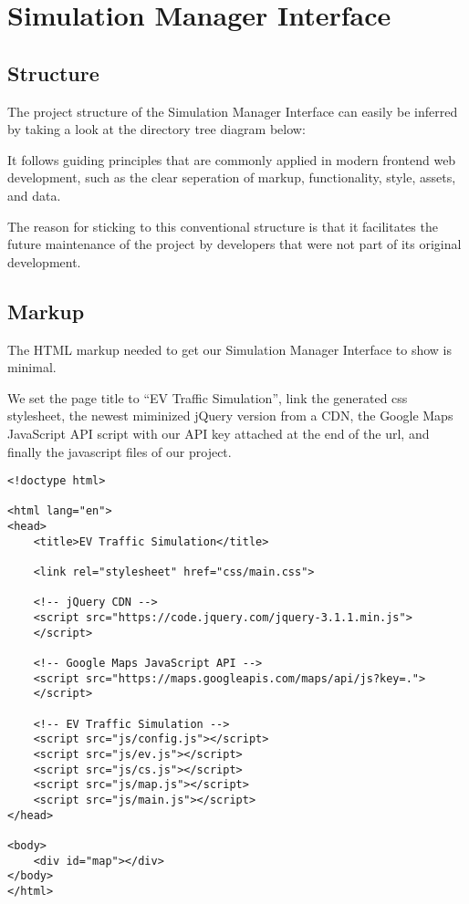 \newpage

\section{Simulation Manager Interface}

\subsection{Structure}

The project structure of the Simulation Manager Interface can easily be inferred by taking a look at the directory tree diagram below:

\vspace{4mm}
\vspace{2mm}

It follows guiding principles that are commonly applied in modern frontend web development, such as the clear seperation of markup, functionality, style, assets, and data.

The reason for sticking to this conventional structure is that it facilitates the future maintenance of the project by developers that were not part of its original development.


\newpage
\subsection{Markup}

The HTML markup needed to get our Simulation Manager Interface to show is minimal.

We set the page title to ``EV Traffic Simulation'', link the generated css stylesheet, the newest miminized jQuery version from a CDN, the Google Maps JavaScript API script with our API key attached at the end of the url, and finally the javascript files of our project.

\begin{verbatim}
<!doctype html>

<html lang="en">
<head>
    <title>EV Traffic Simulation</title>

    <link rel="stylesheet" href="css/main.css">

    <!-- jQuery CDN -->
    <script src="https://code.jquery.com/jquery-3.1.1.min.js">
    </script>

    <!-- Google Maps JavaScript API -->
    <script src="https://maps.googleapis.com/maps/api/js?key=.">
    </script>

    <!-- EV Traffic Simulation -->
    <script src="js/config.js"></script>
    <script src="js/ev.js"></script>
    <script src="js/cs.js"></script>
    <script src="js/map.js"></script>
    <script src="js/main.js"></script>
</head>

<body>
    <div id="map"></div>
</body>
</html>
\end{verbatim}

